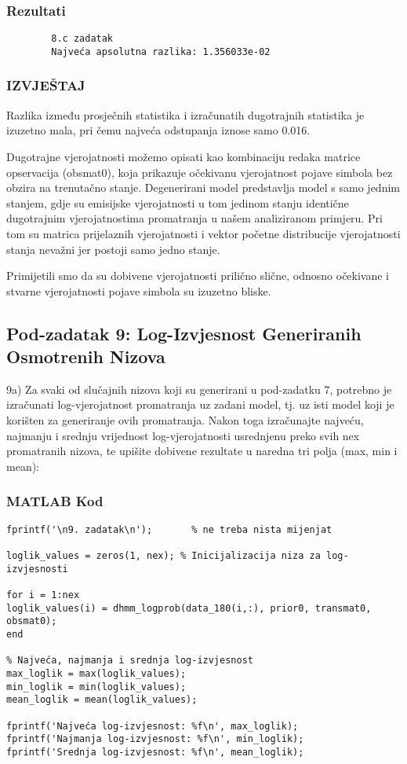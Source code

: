\documentclass[12pt]{article}
\begin{document}
	\subsubsection*{Rezultati}
	\begin{verbatim}
		8.c zadatak
		Najveća apsolutna razlika: 1.356033e-02
	\end{verbatim}
	
	\subsubsection*{IZVJEŠTAJ}
	Razlika između prosječnih statistika i izračunatih dugotrajnih statistika je izuzetno mala, pri čemu najveća odstupanja iznose samo 0.016.
	
	Dugotrajne vjerojatnosti možemo opisati kao kombinaciju redaka matrice opservacija (obsmat0), koja prikazuje očekivanu vjerojatnost pojave simbola bez obzira na trenutačno stanje. Degenerirani model predstavlja model s samo jednim stanjem, gdje su emisijske vjerojatnosti u tom jedinom stanju identične dugotrajnim vjerojatnostima promatranja u našem analiziranom primjeru. Pri tom su matrica prijelaznih vjerojatnosti i vektor početne distribucije vjerojatnosti stanja nevažni jer postoji samo jedno stanje.
	
	Primijetili smo da su dobivene vjerojatnosti prilično slične, odnosno očekivane i stvarne vjerojatnosti pojave simbola su izuzetno bliske.
	
	\subsection{Pod-zadatak 9: Log-Izvjesnost Generiranih Osmotrenih Nizova}
	9a) Za svaki od slučajnih nizova koji su generirani u pod-zadatku 7, potrebno je izračunati log-vjerojatnost promatranja uz zadani model, tj. uz isti model koji je korišten za generiranje ovih promatranja. Nakon toga izračunajte najveću, najmanju i srednju vrijednost log-vjerojatnosti usrednjenu preko svih nex promatranih nizova, te upišite dobivene rezultate u naredna tri polja (max, min i mean):
	
	\subsubsection*{MATLAB Kod}
	\begin{lstlisting}
fprintf('\n9. zadatak\n');       % ne treba nista mijenjat

loglik_values = zeros(1, nex); % Inicijalizacija niza za log-izvjesnosti

for i = 1:nex
loglik_values(i) = dhmm_logprob(data_180(i,:), prior0, transmat0, obsmat0);
end

% Najveća, najmanja i srednja log-izvjesnost
max_loglik = max(loglik_values);
min_loglik = min(loglik_values);
mean_loglik = mean(loglik_values);

fprintf('Najveća log-izvjesnost: %f\n', max_loglik);
fprintf('Najmanja log-izvjesnost: %f\n', min_loglik);
fprintf('Srednja log-izvjesnost: %f\n', mean_loglik);
	\end{lstlisting}
	
\end{document}
